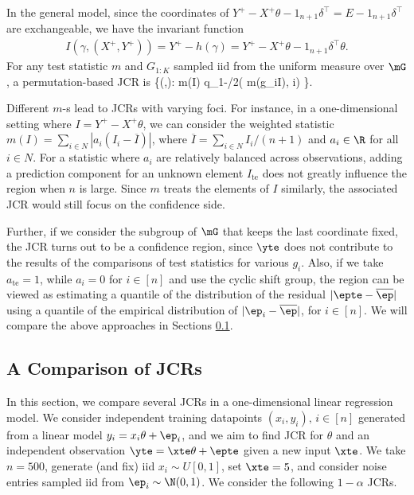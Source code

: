 \documentclass[english]{article}
\begin{document}
In the general model, 
since 
the coordinates of $Y^{+} - X^{+} \theta -1_{n+1} \delta^\top=E-1_{n+1} \delta^\top$ are exchangeable, 
we have the invariant function 
\begin{align}\label{eq:permutation-JCR}
    I(\gamma, (X^{+},Y^{+}))
    = Y^{+} - h(\gamma) =  Y^{+} - X^{+} \theta - 1_{n+1} \delta^\top \theta.
\end{align}
For any test statistic $m$ 
and $G_{1:K}$ sampled iid from the uniform measure over $\mG$,
a permutation-based JCR is
\beq\label{pj}
\bigg\{(\theta,\yte): m(I) \leq q_{1-\alpha/2}\big( m(g_iI), i\in[K] \big) \bigg\}.
\eeq

Different $m$-s lead to JCRs 
with varying foci.
For instance, 
in a
one-dimensional setting
where 
$I = Y^+ - X^+ \theta$, we can consider the weighted statistic $m(I) = \sum_{i \in N} |a_i(I_i- \overline{I})|$, where $\overline{I} = \sum_{i \in N} I_i / (n+1)$
and $a_i \in \R$ for all $i\in N$. 
For a statistic where $a_i$ are  relatively balanced across observations, 
adding a prediction component for an unknown element $I_\mathrm{te}$ does not greatly influence the region when $n$ is large. 
Since $m$ treats the elements of $I$ similarly, the associated JCR would still focus on the confidence side. 

Further, if we consider the subgroup of $\mG$ that keeps the last coordinate fixed, the JCR turns out to be a confidence region, since $\yte$ does not contribute to the results of the comparisons of test statistics for various $g_i$.
Also, if we take $a_{\mathrm{te}} = 1$, while $a_i = 0$ for $i\in [n]$ and use the cyclic shift group, 
the region can be viewed as estimating a quantile of the distribution of the residual $|\epte - \overline{\ep}|$ using a quantile of the empirical distribution of $|\ep_i -\overline{\ep}|$, for $i\in[n]$.
We will compare the above approaches in Sections \ref{sec:comparison-lr}.

\subsection{A Comparison of JCRs}\label{sec:comparison-lr}

In this section, we compare several JCRs in a one-dimensional linear regression model.
We consider independent
training datapoints $(x_i,y_i),\, i\in [n]$ generated from a linear model $y_i = x_i \theta + \ep_i$, and we aim to find JCR for 
$\theta$ and
an independent observation $\yte = \xte \theta + \epte $ given a new input $\xte$.
We take $n=500$, generate (and fix) iid $x_i \sim U[0,1]$,
set $\xte = 5$, 
and consider noise entries sampled iid from
$\ep_i \sim \N(0,1)$. 
We consider the following $1-\alpha$ JCRs. 
\end{document}
